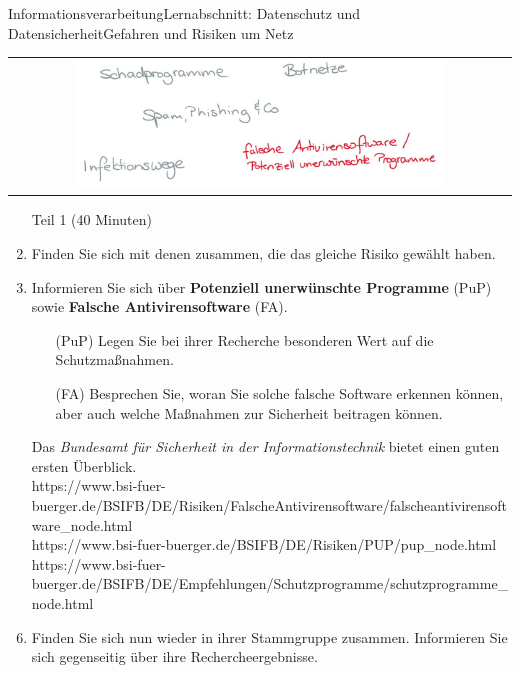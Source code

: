 \documentclass[oneside,openany,headings=optiontotoc,11pt,numbers=noenddot]{scrreprt}
\begin{document}
	\begin{worksheet}{Informationsverarbeitung}{Lernabschnitt: Datenschutz und Datensicherheit}{Gefahren und Risiken um Netz}
		
		\begin{framed}
			\begin{tabular}{lcr}
				& \includegraphics[width=0.8\textwidth]{../99_Bilder/AntivirUnwantedProg.jpg} & \\
			\end{tabular}
		\end{framed}
		\begin{enumerate}[label=(\Roman*.)]
			\item[] \color{gray}Teil 1 (40 Minuten)\normalcolor
			\item Finden Sie sich mit denen zusammen, die das gleiche Risiko gewählt haben.
			\item Informieren Sie sich über \textbf{Potenziell unerwünschte Programme} (PuP) sowie \textbf{Falsche Antivirensoftware} (FA).
			\begin{enumerate}
				\item[(PuP)] Legen Sie bei ihrer Recherche besonderen Wert auf die Schutzmaßnahmen.
				\item[(FA)] Besprechen Sie, woran Sie solche falsche Software erkennen können, aber auch welche Maßnahmen zur Sicherheit beitragen können.
			\end{enumerate}
			\item[] Das \textit{Bundesamt für Sicherheit in der Informationstechnik} bietet einen guten ersten Überblick.\\
			\small{\color{codegray}https://www.bsi-fuer-buerger.de/BSIFB/DE/Risiken/FalscheAntivirensoftware/falscheantivirensoftware\_node.html\\
			https://www.bsi-fuer-buerger.de/BSIFB/DE/Risiken/PUP/pup\_node.html\\
			https://www.bsi-fuer-buerger.de/BSIFB/DE/Empfehlungen/Schutzprogramme/schutzprogramme\_node.html}\\
			\item[] \color{gray}{Teil 2 (30 Minuten)}\normalcolor
			\item Finden Sie sich nun wieder in ihrer Stammgruppe zusammen. Informieren Sie sich gegenseitig über ihre Rechercheergebnisse.
		\end{enumerate}
		

\end{worksheet}
\end{document}
